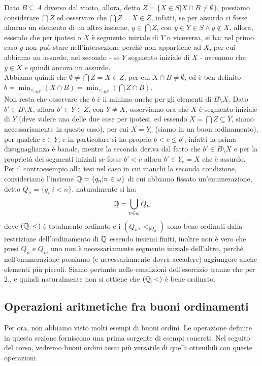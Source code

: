 \begin{soln}
	Dato $B \subseteq A$ diverso dal vuoto, allora, detto $Z = \{X \in S | X \cap B \ne \emptyset\}$, possiamo considerare $\bigcap Z$ ed osservare che $\bigcap Z = X \in Z$, infatti,
	se per assurdo ci fosse almeno un elemento di un altro insieme, $y \in \bigcap Z$, con $y \in Y \in S \land y \not \in X$, allora, essendo che per ipotesi o $X$ è segmento iniziale di $Y$ o viceversa, si ha: nel primo caso $y$ non può stare nell'intersezione perché non appartiene ad $X$, per cui abbiamo un assurdo,
	nel secondo - se $Y$ segmento iniziale di $X$ - avremmo che $y \in X$ e quindi ancora un assurdo.\\
	Abbiamo quindi che $\emptyset \ne \bigcap Z = X \in Z$, per cui $X \cap B \ne \emptyset$, ed è ben definito $b = \min_{<_{A|X}} (X \cap B) = \min_{<_{A|X}} \left(\bigcap Z \cap B\right)$.\\
	Non resta che osservare che $b$ è il minimo anche per gli elementi di $B \setminus X$. Dato $b' \in B \setminus X$, allora $b' \in Y \in Z$, con $Y \ne X$, osserviamo ora che $X$ è segmento iniziale di $Y$ (deve valere una delle due cose per ipotesi, ed essendo $X = \bigcap Z \subseteq Y$, siamo necessariamente in questo caso),
	per cui $X = Y_c$ (siamo in un buon ordinamento), per qualche $c \in Y$, e in particolare si ha proprio $b < c \leq b'$, infatti la prima disuguaglianza è banale, mentre la seconda deriva dal fatto che $b' \in B \setminus X$ 
	e per la proprietà dei segmenti iniziali se fosse $b' < c$ allora $b' \in Y_c = X$ che è assurdo.\\
	Per il controesempio alla tesi nel caso in cui manchi la seconda condizione, consideriamo l'insieme $\mathbb Q = \{q_n | n \in \omega\}$ di cui abbiamo fissato un'enumerazione, detto $Q_n = \{q_i | i < n\}$, naturalmente si ha:
	\[ \mathbb Q = \bigcup_{n \in \omega} Q_n
		\]
	dove $(\mathbb Q,<)$ è totalmente ordinato e i $(Q_n,<_{|Q_n})$ sono bene ordinati dalla restrizione dell'ordinamento di $\mathbb Q$ essendo insiemi finiti, inoltre non è vero che presi $Q_n$ e $Q_m$ uno non è necessariamente segmento iniziale dell'altro,
	perché nell'enumerazione possiamo (e necessariamente dovrà accadere) aggiungere anche elementi più piccoli. Siamo pertanto nelle condizioni dell'esercizio tranne che per 2., e quindi naturalmente non si ottiene che $(\mathbb Q,<)$ è bene ordinato.
\end{soln}

\subsection{Operazioni aritmetiche fra buoni ordinamenti}
Per ora, non abbiamo visto molti esempi di buoni ordini. Le operazione definite in questa sezione forniscono una prima sorgente di esempi concreti.
Nel seguito del corso, vedremo buoni ordini assai più versatile di quelli ottenibili con queste operazioni.

